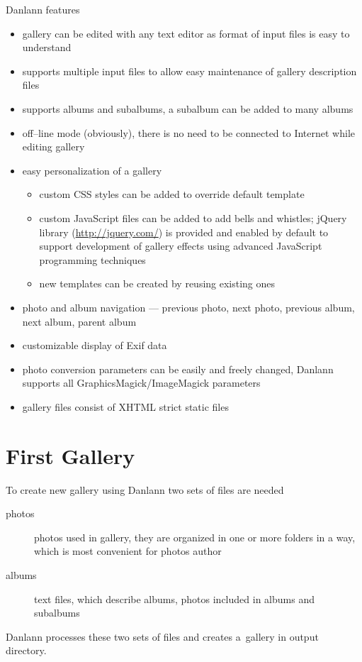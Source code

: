 \documentclass{article}
\begin{document}
Danlann features
\begin{itemize}
\itemsep0pt
\item gallery can be edited with any text editor as format of input files
    is easy to understand
\item supports multiple input files to allow easy maintenance of gallery
    description files
\item supports albums and subalbums, a subalbum can be added to many albums
\item off--line mode (obviously), there is no need to be connected to Internet while
    editing gallery
\item easy personalization of a gallery
    \begin{itemize}
    \itemsep0pt
    \item custom CSS styles can be added to override default template
    \item custom JavaScript files can be added to add bells and whistles;
        jQuery library (\url{http://jquery.com/}) is provided and enabled by
        default to support development of gallery effects using advanced JavaScript
        programming techniques
    \item new templates can be created by reusing existing ones
    \end{itemize}
\item photo and album navigation --- previous photo, next photo, previous
    album, next album, parent album
\item customizable display of Exif data
\item photo conversion parameters can be easily and freely changed,
    Danlann supports all GraphicsMagick/ImageMagick parameters
\item gallery files consist of XHTML strict static files
\end{itemize}

\section{First Gallery}\label{example}
To create new gallery using Danlann two sets of files are needed
\begin{description}
\item[photos] photos used in gallery, they are organized in one or more
folders in a way, which is most convenient for photos author
\item[albums] text files, which describe albums, photos included in albums
    and subalbums
\end{description}
Danlann processes these two sets of files and creates a~gallery in output
directory.
\end{document}
